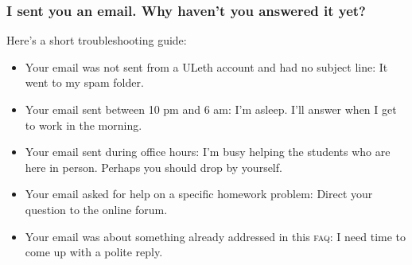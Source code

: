 \documentclass[10pt,]{article}
\newcommand{\initialism}[1]{\textsc{\MakeLowercase{#1}}}
\begin{document}
\subsubsection[{I sent you an email. Why haven't you answered it yet?}]{I sent you an email. Why haven't you answered it yet?}\label{subsubsection-34}
\hypertarget{p-45}{}%
Here's a short troubleshooting guide:%
\leavevmode%
\begin{itemize}[label=\textbullet]
\item{}Your email was not sent from a ULeth account and had no subject line: It went to my spam folder.%
\item{}Your email sent between 10 pm and 6 am: I'm asleep. I'll answer when I get to work in the morning.%
\item{}Your email sent during office hours: I'm busy helping the students who are here in person. Perhaps you should drop by yourself.%
\item{}Your email asked for help on a specific homework problem: Direct your question to the online forum.%
\item{}Your email was about something already addressed in this \initialism{FAQ}: I need time to come up with a polite reply.%
\end{itemize}
%
%
\typeout{************************************************}
\typeout{************************************************}
%
\pagebreak
\end{document}
